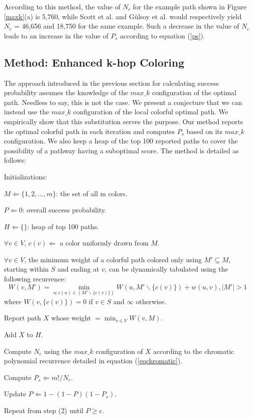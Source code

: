 \documentclass{ws-procs11x85}
\begin{document}
According to this method, the value of $N_c$ for the example path shown in
Figure \ref{maxk}(a) is 5,760, while Scott et al.\cite{scott} and G{\"u}lsoy et
al.\cite{gulsoy} would respectively yield $N_c$ = 46,656 and 18,750 for the same
example. Such a decrease in the value of $N_c$ leads to an increase in the value
of $P_s$ according to equation (\ref{ps}).

\subsection{Method: Enhanced k-hop Coloring}
The approach introduced in the previous section for calculating success
probability assumes the knowledge of the $max\_k$ configuration of the optimal
path. Needless to say, this is not the case. We present a conjecture that we
can instead use the $max\_k$ configuration of the local colorful optimal path.
We empirically show that this substitution serves the purpose. Our method reports
the optimal colorful path in each iteration and computes $P_s$ based on its
$max\_k$ configuration. We also keep a heap of the top 100 reported paths to
cover the possibility of a pathway having a suboptimal score. The method is
detailed as follows:
\begin{arabiclist}[9]
\item Initializations:
	\begin{romanlist}[iii]
	\item $M \Leftarrow \{1, 2, . . . , m\}$: the set of all m colors.
	\item $P \Leftarrow 0$: overall success probability.
	\item $H \Leftarrow \{\}$: heap of top 100 paths.
	\end{romanlist}
\item $\forall v \in V$, $c(v) \Leftarrow$ a color uniformly drawn from $M$.
\item $\forall v \in V$, the minimum weight of a colorful path colored only
using $M' \subseteq M$, starting within $S$ and ending at $v$, can be
dynamically tabulated using the following recurrence\cite{scott}:
\begin{equation}
W(v, M') = \min_{u:c(u) \in (M' \backslash \{c(v)\})} W(u, M' \backslash
\{c(v)\}) + w(u, v), |M'| > 1
\end{equation}
where $W(v, \{c(v)\}) = 0$ if $v \in S$ and $\infty$ otherwise.
\item Report path $X$ whose weight $= \min_{v \in V} W(v, M)$.
\item Add $X$ to $H$.
\item Compute $N_c$ using the $max\_k$ configuration of $X$ according to the
chromatic polynomial recurrence detailed in equation (\ref{eqchromatic}).
\item Compute $P_s \Leftarrow m! / N_c$.
\item Update $P \Leftarrow 1 - (1 - P)(1 - P_s)$.
\item Repeat from step (2) until $P \geq \epsilon$.
\end{arabiclist}
\end{document}
